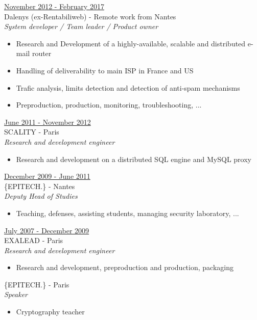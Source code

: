 \documentclass[a4paper,10pt]{letter}
\begin{document}
\begin{description}
\item{\underline{November 2012 - February 2017}}\\
  Dalenys (ex-Rentabiliweb) - Remote work from Nantes\\
  \textit{System developer / Team leader / Product owner}
  \begin{itemize}
  \item Research and Development of a highly-available, scalable and distributed e-mail router
  \item Handling of deliverability to main ISP in France and US
  \item Trafic analysis, limits detection and detection of anti-spam mechanisms
  \item Preproduction, production, monitoring, troubleshooting, ...\\
  \end{itemize}

\item{\underline{June 2011 - November 2012}}\\
  SCALITY - Paris\\
  \textit{Research and development engineer}
  \begin{itemize}
  \item Research and development on a distributed SQL engine and MySQL proxy\\
  \end{itemize}

\item{\underline{December 2009 - June 2011}}\\
  \{EPITECH.\} - Nantes\\
  \textit{Deputy Head of Studies}
  \begin{itemize}
  \item Teaching, defenses, assisting students, managing security laboratory, ...\\
  \end{itemize}

\item{\underline{July 2007 - December 2009}}\\
  EXALEAD - Paris\\
  \textit{Research and development engineer}
  \begin{itemize}
  \item Research and development, preproduction and production, packaging\\
  \end{itemize}

  \{EPITECH.\} - Paris\\
  \textit{Speaker}
  \begin{itemize}
  \item Cryptography teacher\\
  \end{itemize}


\end{description}
\end{document}
